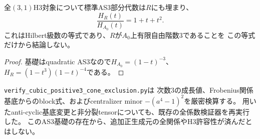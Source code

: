 \begin{corollary}\label{cor:h3-positive3-AS3-base-Hilbert}
全$(3,1)$H3対象について標準AS3部分代数は$R$にも埋まり、
\[
 \frac{H_R(t)}{H_{A_0}(t)}=1+t+t^2.
\]
これはHilbert級数の等式であり、$R$が$A_0$上有限自由階数3であることを
この等式だけから結論しない。
\end{corollary}
\begin{proof}
基礎はquadratic AS3なので$H_{A_0}=(1-t)^{-3}$、
$H_R=(1-t^3)(1-t)^{-4}$である。
\end{proof}

\texttt{verify\_cubic\_positive3\_cone\_exclusion.py}は
次数3の成長値、Frobenius関係基底からのblock式、およびcentralizer minor
$-(a^4-1)^2$を厳密検算する。
用いたanti-cyclic基底変更と非分裂tensorについても、既存の全係数検証器を再実行した。
このAS3基礎の存在から、追加正生成元の全関係やH3許容性が済んだとはしない。
